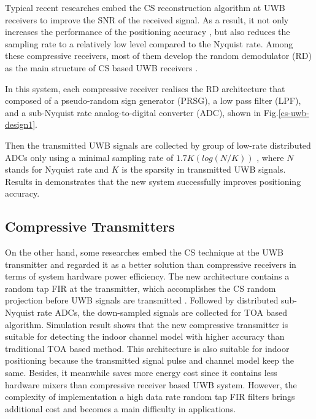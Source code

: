 Typical recent researches embed the CS reconstruction algorithm at UWB receivers to improve the SNR of the received signal. As a result, it not only increases the performance of the positioning accuracy \cite{banitalebi2014compressive}, but also reduces the sampling rate to a relatively low level compared to the Nyquist rate. Among these compressive receivers, most of them develop the random demodulator (RD) \cite{kirolos2006analog} as the main structure of CS based UWB receivers \cite{yang2011compressive}. 

In this system, each compressive receiver realises the RD architecture that composed of a pseudo-random sign generator (PRSG), a low pass filter (LPF), and a sub-Nyquist rate analog-to-digital converter (ADC), shown in Fig.\ref{cs-uwb-design1}. 

Then the transmitted UWB signals are collected by group of low-rate distributed ADCs only using a minimal sampling rate of $1.7K(log(N/K))$ \cite{kirolos2006analog}, where $N$ stands for Nyquist rate and $K$ is the sparsity in transmitted UWB signals. Results in \cite{yang2013compressive} demonstrates that the new system successfully improves positioning accuracy. 

\subsection{Compressive Transmitters}

\indent \indent On the other hand, some researches embed the CS technique at the UWB transmitter and regarded it as a better solution than compressive receivers in terms of system hardware power efficiency. The new architecture contains a random tap FIR at the transmitter, which accomplishes the CS random projection before UWB signals are transmitted \cite{zhang2009compressed}. Followed by distributed sub-Nyquist rate ADCs, the down-sampled signals are collected for TOA based algorithm. Simulation result \cite{zhang2009compressed} shows that the new compressive transmitter is suitable for detecting the indoor channel model with higher accuracy than traditional TOA based method. This architecture is also suitable for indoor positioning because the transmitted signal pulse and channel model keep the same. Besides, it meanwhile saves more energy cost since it contains less hardware mixers than compressive receiver based UWB system. However, the complexity of implementation a high data rate random tap FIR filters brings additional cost and becomes a main difficulty in applications.

